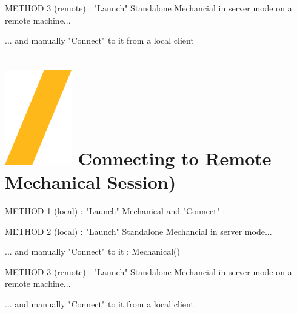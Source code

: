 \documentclass[9pt,landscape]{article}
\begin{document}
\begin{multicols}{3}

METHOD 3 (remote) :
"Launch" Standalone Mechancial in server mode on a remote machine...


... and manually "Connect" to it from a local client


\vfill
\section{\includegraphics[height=\fontcharht\font`\S]{slash.png} Connecting to Remote Mechanical Session)}
METHOD 1 (local) :
"Launch" Mechanical and "Connect" :


METHOD 2 (local) :
"Launch" Standalone Mechancial in server mode...


... and manually "Connect" to it : Mechanical()


METHOD 3 (remote) :
"Launch" Standalone Mechancial in server mode on a remote machine...


... and manually "Connect" to it from a local client





\end{multicols}
\end{document}
